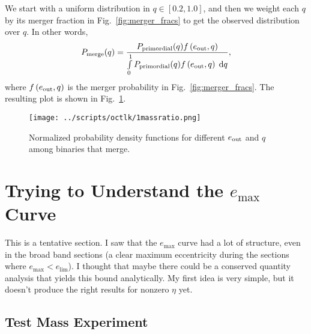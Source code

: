 \documentclass[11pt,
        usenames, %
        dvipsnames %
    ]{article}
\newcommand*{\p}[1]{\left(#1\right)}
\begin{document}
We start with a uniform distribution in $q \in [0.2, 1.0]$, and then we weight
each $q$ by its merger fraction in Fig.~\ref{fig:merger_fracs} to get the
observed distribution over $q$. In other words,
\begin{equation}
    P_{\rm merge}(q) = \frac{P_{\rm primordial}(q) f\p{e_{\rm out}, q}}{
        \int\limits_0^1 P_{\rm primordial}(q) f\p{e_{\rm out}, q}\;\mathrm{d}q},
\end{equation}
where $f\p{e_{\rm out}, q}$ is the merger probability in
Fig.~\ref{fig:merger_fracs}. The resulting plot is shown in
Fig.~\ref{fig:massratio}.
\begin{figure}[h]
    \centering
    \texttt{[image: ../scripts/octlk/1massratio.png]}
    \caption{Normalized probability density functions for different $e_{\rm
    out}$ and $q$ among binaries that merge.}\label{fig:massratio}
\end{figure}

\section{Trying to Understand the $e_{\max}$ Curve}

This is a tentative section. I saw that the $e_{\max}$ curve had a lot of
structure, even in the broad band sections (a clear maximum eccentricity during
the sections where $e_{\max} < e_{\lim}$). I thought that maybe there could be a
conserved quantity analysis that yields this bound analytically. My first idea
is very simple, but it doesn't produce the right results for nonzero $\eta$ yet.

\subsection{Test Mass Experiment}
\end{document}
